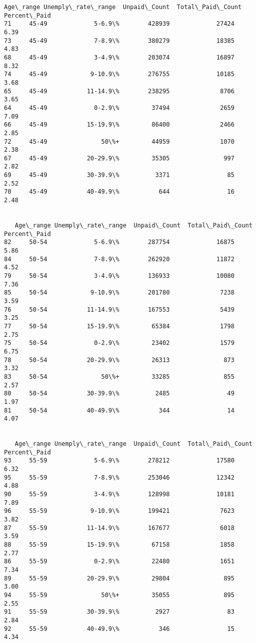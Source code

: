 \documentclass[11pt]{article}
\begin{document}
\begin{Verbatim}[commandchars=\\\{\}]
   Age\_range Unemply\_rate\_range  Unpaid\_Count  Total\_Paid\_Count  Percent\_Paid
71     45-49             5-6.9\%        428939             27424          6.39
73     45-49             7-8.9\%        380279             18385          4.83
68     45-49             3-4.9\%        203074             16897          8.32
74     45-49            9-10.9\%        276755             10185          3.68
65     45-49           11-14.9\%        238295              8706          3.65
64     45-49             0-2.9\%         37494              2659          7.09
66     45-49           15-19.9\%         86400              2466          2.85
72     45-49               50\%+         44959              1070          2.38
67     45-49           20-29.9\%         35305               997          2.82
69     45-49           30-39.9\%          3371                85          2.52
70     45-49           40-49.9\%           644                16          2.48


   Age\_range Unemply\_rate\_range  Unpaid\_Count  Total\_Paid\_Count  Percent\_Paid
82     50-54             5-6.9\%        287754             16875          5.86
84     50-54             7-8.9\%        262920             11872          4.52
79     50-54             3-4.9\%        136933             10080          7.36
85     50-54            9-10.9\%        201780              7238          3.59
76     50-54           11-14.9\%        167553              5439          3.25
77     50-54           15-19.9\%         65384              1798          2.75
75     50-54             0-2.9\%         23402              1579          6.75
78     50-54           20-29.9\%         26313               873          3.32
83     50-54               50\%+         33285               855          2.57
80     50-54           30-39.9\%          2485                49          1.97
81     50-54           40-49.9\%           344                14          4.07


   Age\_range Unemply\_rate\_range  Unpaid\_Count  Total\_Paid\_Count  Percent\_Paid
93     55-59             5-6.9\%        278212             17580          6.32
95     55-59             7-8.9\%        253046             12342          4.88
90     55-59             3-4.9\%        128998             10181          7.89
96     55-59            9-10.9\%        199421              7623          3.82
87     55-59           11-14.9\%        167677              6018          3.59
88     55-59           15-19.9\%         67158              1858          2.77
86     55-59             0-2.9\%         22480              1651          7.34
89     55-59           20-29.9\%         29804               895          3.00
94     55-59               50\%+         35055               895          2.55
91     55-59           30-39.9\%          2927                83          2.84
92     55-59           40-49.9\%           346                15          4.34



\end{Verbatim}
\end{document}
